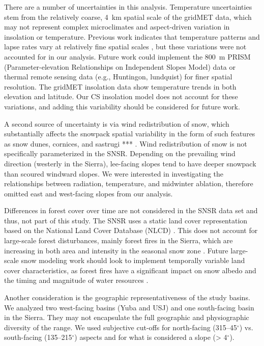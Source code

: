 There are a number of uncertainties in this analysis. Temperature uncertainties stem from the relatively coarse, 4~km spatial scale of the gridMET data, which may not represent complex microclimates and aspect-driven variation in insolation or temperature. Previous work indicates that temperature patterns and lapse rates vary at relatively fine spatial scales \citep{lundquistSurfaceTemperaturePatterns2007, robledanoModellingSurfaceTemperature2022}, but these variations were not accounted for in our analysis. Future work could implement the 800~m PRISM (Parameter-elevation Relationships on Independent Slopes Model) data \citep{dalyStatisticalTopographicModelMapping1994} or thermal remote sensing data (e.g., Huntingon, lundquist) for finer spatial resolution. The gridMET insolation data show temperature trends in both elevation and latitude. Our CS insolation model does not account for these variations, and adding this variability should be considered for future work.

A second source of uncertainty is via wind redistribution of snow, which substantially affects the snowpack spatial variability in the form of such features as snow dunes, cornices, and sastrugi *** \citep{winstralSpatialSnowModeling2002,marksSimulationTerrainForest2002}.  Wind redistribution of snow is not specifically parameterized in the SNSR. Depending on the prevailing wind direction (westerly in the Sierra), lee-facing slopes tend to have deeper snowpack than scoured windward slopes. We were interested in investigating the relationships between radiation, temperature, and midwinter ablation, therefore omitted east and west-facing slopes from our analysis.

Differences in forest cover over time are not considered in the SNSR data set and thus, not part of this study. The SNSR uses a static land cover representation based on the National Land Cover Database (NLCD) \citep{homerConterminousUnitedStates2020}. This does not account for large-scale forest disturbances, mainly forest fires in the Sierra, which are increasing in both area and intensity in the seasonal snow zone \citep{koshkinWildfireImpactsWestern2022}. Future large-scale snow modeling work should look to implement temporally variable land cover characteristics, as forest fires have a significant impact on snow albedo \cite{gleasonCharredForestsIncrease2013} and the timing and magnitude of water resources \citep{williamsGrowingImpactWildfire2022}.

Another consideration is the geographic representativeness of the study basins. We analyzed two west-facing basins (Yuba and USJ) and one south-facing basin in the Sierra. They may not encapsulate the full geographic and physiographic diversity of the range. We used subjective cut-offs for north-facing (315--45$^{\circ}$) vs. south-facing (135--215$^{\circ}$) aspects and for what is considered a slope (> 4$^{\circ}$).


